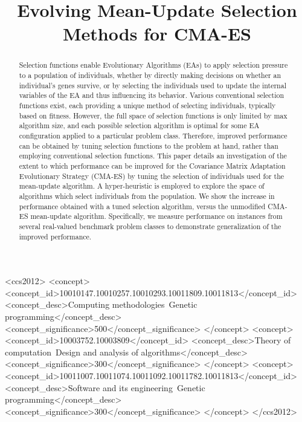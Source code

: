\documentclass[sigconf]{acmart}
\begin{document}
\title[Evolving Mean-Update Selection Methods for CMA-ES]{Evolving Mean-Update Selection Methods for CMA-ES}


\begin{abstract}

Selection functions enable Evolutionary Algorithms (EAs) to apply selection pressure to a population of individuals, whether by directly making decisions on whether an individual’s genes survive, or by selecting the individuals used to update the internal variables of the EA and thus influencing its behavior. Various conventional selection functions exist, each providing a unique method of selecting individuals, typically based on fitness. However, the full space of selection functions is only limited by max algorithm size, and each possible selection algorithm is optimal for some EA configuration applied to a particular problem class. Therefore, improved performance can be obtained by tuning selection functions to the problem at hand, rather than employing conventional selection functions. This paper details an investigation of the extent to which performance can be improved for the Covariance Matrix Adaptation Evolutionary Strategy (CMA-ES) by tuning the selection of individuals used for the mean-update algorithm. A hyper-heuristic is employed to explore the space of algorithms which select individuals from the population. We show the increase in performance obtained with a tuned selection algorithm, versus the unmodified CMA-ES mean-update algorithm. Specifically, we measure performance on instances from several real-valued benchmark problem classes to demonstrate generalization of the improved performance.

\end{abstract}

%
%


\begin{CCSXML}
	<ccs2012>
	<concept>
	<concept_id>10010147.10010257.10010293.10011809.10011813</concept_id>
	<concept_desc>Computing methodologies~Genetic programming</concept_desc>
	<concept_significance>500</concept_significance>
	</concept>
	<concept>
	<concept_id>10003752.10003809</concept_id>
	<concept_desc>Theory of computation~Design and analysis of algorithms</concept_desc>
	<concept_significance>300</concept_significance>
	</concept>
	<concept>
	<concept_id>10011007.10011074.10011092.10011782.10011813</concept_id>
	<concept_desc>Software and its engineering~Genetic programming</concept_desc>
	<concept_significance>300</concept_significance>
	</concept>
	</ccs2012>
\end{CCSXML}
\end{document}
